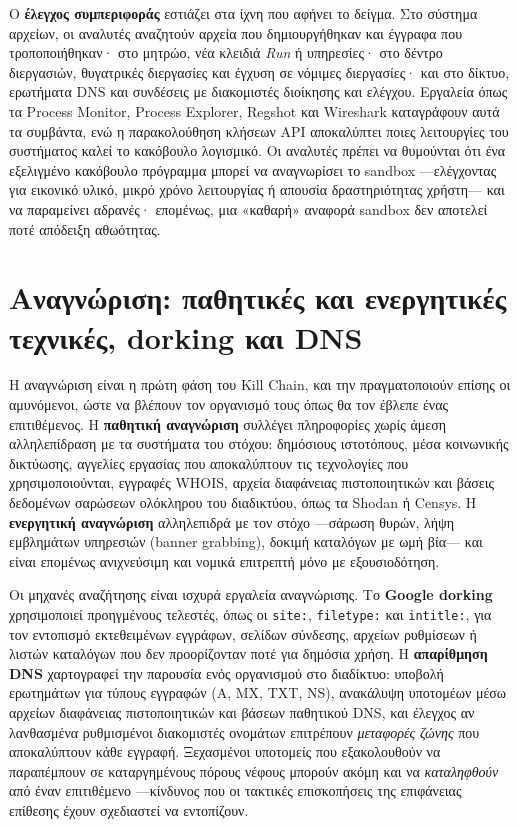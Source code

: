 Ο \textbf{έλεγχος συμπεριφοράς} εστιάζει στα ίχνη που αφήνει το δείγμα. Στο σύστημα αρχείων, οι αναλυτές αναζητούν αρχεία που δημιουργήθηκαν και έγγραφα που τροποποιήθηκαν· στο μητρώο, νέα κλειδιά \emph{Run} ή υπηρεσίες· στο δέντρο διεργασιών, θυγατρικές διεργασίες και έγχυση σε νόμιμες διεργασίες· και στο δίκτυο, ερωτήματα DNS και συνδέσεις με διακομιστές διοίκησης και ελέγχου. Εργαλεία όπως τα Process Monitor, Process Explorer, Regshot και Wireshark καταγράφουν αυτά τα συμβάντα, ενώ η παρακολούθηση κλήσεων API αποκαλύπτει ποιες λειτουργίες του συστήματος καλεί το κακόβουλο λογισμικό. Οι αναλυτές πρέπει να θυμούνται ότι ένα εξελιγμένο κακόβουλο πρόγραμμα μπορεί να αναγνωρίσει το sandbox —ελέγχοντας για εικονικό υλικό, μικρό χρόνο λειτουργίας ή απουσία δραστηριότητας χρήστη— και να παραμείνει αδρανές· επομένως, μια «καθαρή» αναφορά sandbox δεν αποτελεί ποτέ απόδειξη αθωότητας.

\section{Αναγνώριση: παθητικές και ενεργητικές τεχνικές, dorking και DNS}\label{sec:12.3}
Η αναγνώριση είναι η πρώτη φάση του Kill Chain, και την πραγματοποιούν επίσης οι αμυνόμενοι, ώστε να βλέπουν τον οργανισμό τους όπως θα τον έβλεπε ένας επιτιθέμενος. Η \textbf{παθητική αναγνώριση} συλλέγει πληροφορίες χωρίς άμεση αλληλεπίδραση με τα συστήματα του στόχου: δημόσιους ιστοτόπους, μέσα κοινωνικής δικτύωσης, αγγελίες εργασίας που αποκαλύπτουν τις τεχνολογίες που χρησιμοποιούνται, εγγραφές WHOIS, αρχεία διαφάνειας πιστοποιητικών και βάσεις δεδομένων σαρώσεων ολόκληρου του διαδικτύου, όπως τα Shodan ή Censys. Η \textbf{ενεργητική αναγνώριση} αλληλεπιδρά με τον στόχο —σάρωση θυρών, λήψη εμβλημάτων υπηρεσιών (banner grabbing), δοκιμή καταλόγων με ωμή βία— και είναι επομένως ανιχνεύσιμη και νομικά επιτρεπτή μόνο με εξουσιοδότηση.

Οι μηχανές αναζήτησης είναι ισχυρά εργαλεία αναγνώρισης. Το \textbf{Google dorking} χρησιμοποιεί προηγμένους τελεστές, όπως οι \texttt{site:}, \texttt{filetype:} και \texttt{intitle:}, για τον εντοπισμό εκτεθειμένων εγγράφων, σελίδων σύνδεσης, αρχείων ρυθμίσεων ή λιστών καταλόγων που δεν προορίζονταν ποτέ για δημόσια χρήση. Η \textbf{απαρίθμηση DNS} χαρτογραφεί την παρουσία ενός οργανισμού στο διαδίκτυο: υποβολή ερωτημάτων για τύπους εγγραφών (A, MX, TXT, NS), ανακάλυψη υποτομέων μέσω αρχείων διαφάνειας πιστοποιητικών και βάσεων παθητικού DNS, και έλεγχος αν λανθασμένα ρυθμισμένοι διακομιστές ονομάτων επιτρέπουν \emph{μεταφορές ζώνης} που αποκαλύπτουν κάθε εγγραφή. Ξεχασμένοι υποτομείς που εξακολουθούν να παραπέμπουν σε καταργημένους πόρους νέφους μπορούν ακόμη και να \emph{καταληφθούν} από έναν επιτιθέμενο —κίνδυνος που οι τακτικές επισκοπήσεις της επιφάνειας επίθεσης έχουν σχεδιαστεί να εντοπίζουν.

